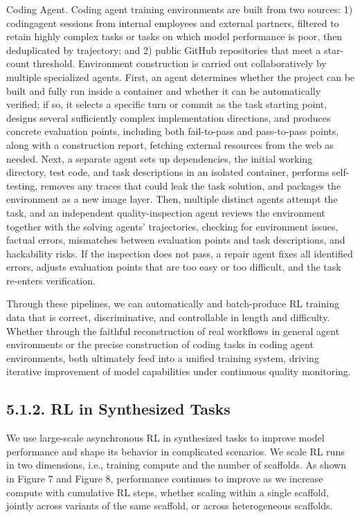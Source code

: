 \documentclass[
  10
]{article}
\begin{document}
Coding Agent. Coding agent training environments are built from two
sources: 1) codingagent sessions from internal employees and external
partners, filtered to retain highly complex tasks or tasks on which
model performance is poor, then deduplicated by trajectory; and 2)
public GitHub repositories that meet a star-count threshold. Environment
construction is carried out collaboratively by multiple specialized
agents. First, an agent determines whether the project can be built and
fully run inside a container and whether it can be automatically
verified; if so, it selects a specific turn or commit as the task
starting point, designs several sufficiently complex implementation
directions, and produces concrete evaluation points, including both
fail-to-pass and pass-to-pass points, along with a construction report,
fetching external resources from the web as needed. Next, a separate
agent sets up dependencies, the initial working directory, test code,
and task descriptions in an isolated container, performs self-testing,
removes any traces that could leak the task solution, and packages the
environment as a new image layer. Then, multiple distinct agents attempt
the task, and an independent quality-inspection agent reviews the
environment together with the solving agents' trajectories, checking for
environment issues, factual errors, mismatches between evaluation points
and task descriptions, and hackability risks. If the inspection does not
pass, a repair agent fixes all identified errors, adjusts evaluation
points that are too easy or too difficult, and the task re-enters
verification.

Through these pipelines, we can automatically and batch-produce RL
training data that is correct, discriminative, and controllable in
length and difficulty. Whether through the faithful reconstruction of
real workflows in general agent environments or the precise construction
of coding tasks in coding agent environments, both ultimately feed into
a unified training system, driving iterative improvement of model
capabilities under continuous quality monitoring.

\subsection{5.1.2. RL in Synthesized
Tasks}\label{rl-in-synthesized-tasks}

We use large-scale asynchronous RL in synthesized tasks to improve model
performance and shape its behavior in complicated scenarios. We scale RL
runs in two dimensions, i.e., training compute and the number of
scaffolds. As shown in Figure 7 and Figure 8, performance continues to
improve as we increase compute with cumulative RL steps, whether scaling
within a single scaffold, jointly across variants of the same scaffold,
or across heterogeneous scaffolds.
\end{document}
